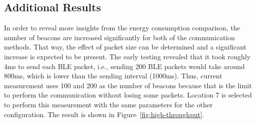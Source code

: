 \documentclass[journal]{vgtc}                %
\begin{document}


\subsection{Additional Results} %
\label{sub:additional_results}
In order to reveal more insights from the energy consumption comparison, the number of beacons are increased significantly for both of the communication methods. That way, the effect of packet size can be determined and a significant increase is expected to be present. The early testing revealed that it took roughly 4ms to send each BLE packet, i.e., sending 200 BLE packets would take around 800ms, which is lower than the sending interval (1000ms). Thus, current measurement uses 100 and 200 as the number of beacons because that is the limit to perform the communication without losing some packets.  Location 7 is selected to perform this measurement with the same parameters for the other configuration. The result is shown in Figure~\ref{fig:high-throughput}.
\end{document}
